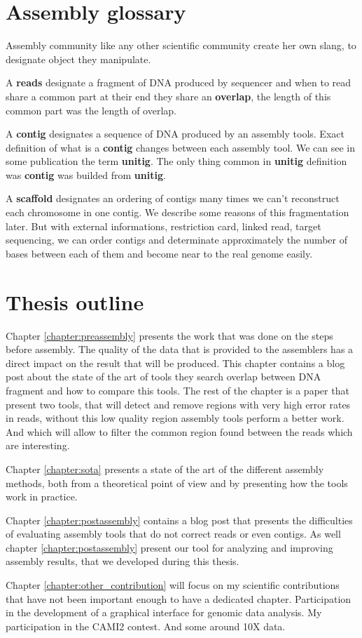 \documentclass[./main.tex]{subfiles}
\begin{document}
\section{Assembly glossary} 

Assembly community like any other scientific community create her own slang, to designate object they manipulate.

A \textbf{reads} designate a fragment of DNA produced by sequencer and when to read share a common part at their end they share an \textbf{overlap}, the length of this common part was the length of overlap.

A \textbf{contig} designates a sequence of DNA produced by an assembly tools. Exact definition of what is a \textbf{contig} changes between each assembly tool. We can see in some publication the term \textbf{unitig}. The only thing common in \textbf{unitig} definition was \textbf{contig} was builded from \textbf{unitig}.

A \textbf{scaffold} designates an ordering of contigs many times we can't reconstruct each chromosome in one contig. We describe some reasons of this fragmentation later. But with external informations, restriction card, linked read, target sequencing, we can order contigs and determinate approximately the number of bases between each of them and become near to the real genome easily.

\section{Thesis outline}

Chapter \ref{chapter:preassembly} presents the work that was done on the steps before assembly. The quality of the data that is provided to the assemblers has a direct impact on the result that will be produced. This chapter contains a blog post about the state of the art of tools they search overlap between DNA fragment and how to compare this tools. The rest of the chapter is a paper that present two tools, \yacrd that will detect and remove regions with very high error rates in reads, without this low quality region assembly tools perform a better work. And \fpa which will allow to filter the common region found between the reads which are interesting.

Chapter \ref{chapter:sota} presents a state of the art of the different assembly methods, both from a theoretical point of view and by presenting how the tools work in practice.

Chapter \ref{chapter:postassembly} contains a blog post that presents the difficulties of evaluating assembly tools that do not correct reads or even contigs. As well chapter \ref{chapter:postassembly} present our tool for analyzing and improving assembly results, \knot that we developed during this thesis.

Chapter \ref{chapter:other_contribution} will focus on my scientific contributions that have not been important enough to have a dedicated chapter. Participation in the development of a graphical interface for genomic data analysis. My participation in the CAMI2 contest. And some around 10X data.

%
%
\end{document}
